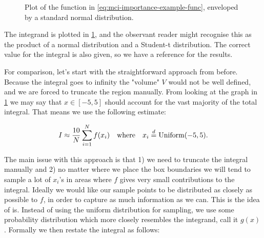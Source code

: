 \documentclass[Thesis.tex]{subfiles}
\begin{document}
\begin{figure}
    \centering
    \caption[Illustration of example probability distributions]{\label{fig:mci-importance-example-func-plot}Plot of the function in
      \cref{eq:mci-importance-example-func}, enveloped by a standard normal distribution.}
\end{figure}
\noindent The integrand is plotted in \cref{fig:mci-importance-example-func-plot}, and
the observant reader might recognise this as the product of a normal
distribution and a Student-t distribution. The correct value for the integral
is also given, so we have a reference for the results.

For comparison, let's start with the straightforward approach from before.
Because the integral goes to infinity the "volume" $V$ would not be well
defined, and we are forced to truncate the region manually. From looking at the
graph in \cref{fig:mci-importance-example-func-plot} we may say that $x\in
[-5, 5]$ should account for the vast majority of the total integral. That means
we use the following estimate:

\begin{align}
    \label{eq:chp-mc-anon-2}
    I\approx \frac{10}{N}\sum_{i=1}^Nf(x_i)\qq{where} x_i\disteq\text{Uniform}(-5, 5).
\end{align}

\noindent The main issue with this approach is that 1) we need to truncate the integral
manually and 2) no matter where we place the box boundaries we will tend to
sample a lot of $x_i$'s in areas where $f$ gives very small contributions to
the integral. Ideally we would like our sample points to be distributed as
closely as possible to $f$, in order to capture as much information as we can.
This is the idea of \gls{is}. Instead of using the uniform
distribution for sampling, we use some probability distribution which more
closely resembles the integrand, call it $g(x)$. Formally we then restate the integral as follows:
\end{document}
